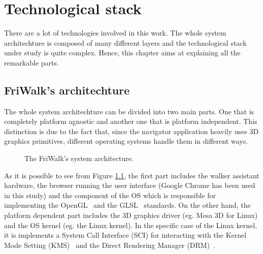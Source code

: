 \chapter{Technological stack} \label{cha:tech_stack}

There are a lot of technologies involved in this work. The whole system
architechture is composed of many different layers and the technological
stack under study is quite complex. Hence, this chapter aims at explaining
all the remarkable parts.


\section{FriWalk's architechture}
The whole system architechture can be divided into two main parts. One that
is completely platform agnostic and another one that is platform independent.
This distinction is due to the fact that, since the navigator application heavily
uses 3D graphics primitives, different operating systems handle them in different
ways.
\begin{figure}[!htb]\label{img:system_arch}
    \caption{The FriWalk's system architecture.}
\end{figure}

As it is possible to see from Figure \ref{img:system_arch}, the first part includes
the walker assistant hardware, the browser running the
user interface (Google Chrome has been used in this study) and the component of
the OS which is responsible for implementing the OpenGL~\cite{woo1999opengl}
and the GLSL~\cite{marroquim2009introduction} standards. On the other hand,
the platform dependent part includes the 3D graphics driver (eg. Mesa 3D for
Linux) and the OS kernel (eg. the Linux kernel). In the specific case of the
Linux kernel, it is implements a System Call Interface (SCI) for interacting
with the Kernel Mode Setting (KMS)~\cite{linuxkms} and the Direct Rendering Manager
(DRM)~\cite{paul2000introduction}.


